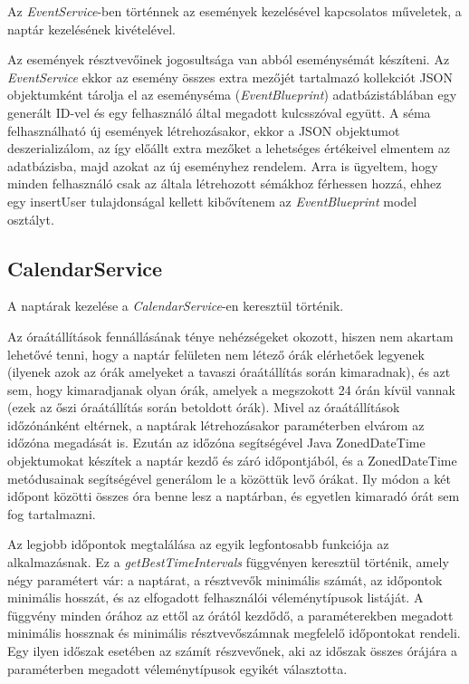 \documentclass[a4paper,12pt]{report}
\theoremstyle{definition}
\theoremstyle{remark}
\begin{document}
Az \textit{EventService}-ben történnek az események kezelésével kapcsolatos műveletek, a naptár kezelésének kivételével. 

Az események résztvevőinek jogosultsága van abból eseménysémát készíteni. Az \textit{EventService} ekkor az esemény összes extra mezőjét tartalmazó kollekciót JSON objektumként tárolja el az eseményséma (\textit{EventBlueprint}) adatbázistáblában egy generált ID-vel és egy felhasználó által megadott kulcsszóval együtt. A séma felhasználható új események létrehozásakor, ekkor a JSON objektumot deszerializálom, az így előállt extra mezőket a lehetséges értékeivel elmentem az adatbázisba, majd azokat az új eseményhez rendelem. Arra is ügyeltem, hogy minden felhasználó csak az általa létrehozott sémákhoz férhessen hozzá, ehhez egy insertUser tulajdonságal kellett kibővítenem az \textit{EventBlueprint} model osztályt.

\subsection{CalendarService}

A naptárak kezelése a \textit{CalendarService}-en keresztül történik.

Az óraátállítások fennállásának ténye nehézségeket okozott, hiszen nem akartam lehetővé tenni, hogy a naptár felületen nem létező órák elérhetőek legyenek (ilyenek azok az órák amelyeket a tavaszi óraátállítás során kimaradnak), és azt sem, hogy kimaradjanak olyan órák, amelyek a megszokott 24 órán kívül vannak (ezek az őszi óraátállítás során betoldott órák). Mivel az óraátállítások időzónánként eltérnek, a naptárak létrehozásakor paraméterben elvárom az időzóna megadását is. Ezután az időzóna segítségével Java ZonedDateTime objektumokat készítek a naptár kezdő és záró időpontjából, és a ZonedDateTime metódusainak segítségével generálom le a közöttük levő órákat. Ily módon a két időpont közötti összes óra benne lesz a naptárban, és egyetlen kimaradó órát sem fog tartalmazni.

Az legjobb időpontok megtalálása az egyik legfontosabb funkciója az alkalmazásnak. Ez a \textit{getBestTimeIntervals} függvényen keresztül történik, amely négy paramétert vár: a naptárat, a résztvevők minimális számát, az időpontok minimális hosszát, és az elfogadott felhasználói véleménytípusok listáját. A függvény minden órához az ettől az órától kezdődő, a paraméterekben megadott minimális hossznak és minimális résztvevőszámnak megfelelő időpontokat rendeli. Egy ilyen időszak esetében az számít részvevőnek, aki az időszak összes órájára a paraméterben megadott véleménytípusok egyikét választotta.
\end{document}

